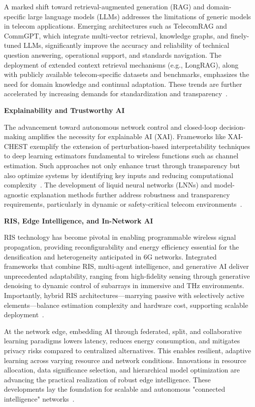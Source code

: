 \documentclass[sigconf]{acmart}
\begin{document}
A marked shift toward retrieval-augmented generation (RAG) and domain-specific large language models (LLMs) addresses the limitations of generic models in telecom applications. Emerging architectures such as TelecomRAG and CommGPT, which integrate multi-vector retrieval, knowledge graphs, and finely-tuned LLMs, significantly improve the accuracy and reliability of technical question answering, operational support, and standards navigation. The deployment of extended context retrieval mechanisms (e.g., LongRAG), along with publicly available telecom-specific datasets and benchmarks, emphasizes the need for domain knowledge and continual adaptation. These trends are further accelerated by increasing demands for standardization and transparency~\cite{ref13, ref14, ref15, ref16, ref17, ref18, ref19, ref20}.

\textbf{Explainability and Trustworthy AI}

The advancement toward autonomous network control and closed-loop decision-making amplifies the necessity for explainable AI (XAI). Frameworks like XAI-CHEST exemplify the extension of perturbation-based interpretability techniques to deep learning estimators fundamental to wireless functions such as channel estimation. Such approaches not only enhance trust through transparency but also optimize systems by identifying key inputs and reducing computational complexity~\cite{ref43, ref44, ref45, ref46, ref47, ref48, ref49}. The development of liquid neural networks (LNNs) and model-agnostic explanation methods further address robustness and transparency requirements, particularly in dynamic or safety-critical telecom environments~\cite{ref43}.

\textbf{RIS, Edge Intelligence, and In-Network AI}

RIS technology has become pivotal in enabling programmable wireless signal propagation, providing reconfigurability and energy efficiency essential for the densification and heterogeneity anticipated in 6G networks. Integrated frameworks that combine RIS, multi-agent intelligence, and generative AI deliver unprecedented adaptability, ranging from high-fidelity sensing through generative denoising to dynamic control of subarrays in immersive and THz environments. Importantly, hybrid RIS architectures—marrying passive with selectively active elements—balance estimation complexity and hardware cost, supporting scalable deployment~\cite{ref28, ref29, ref30, ref31, ref32, ref33, ref34}.

At the network edge, embedding AI through federated, split, and collaborative learning paradigms lowers latency, reduces energy consumption, and mitigates privacy risks compared to centralized alternatives. This enables resilient, adaptive learning across varying resource and network conditions. Innovations in resource allocation, data significance selection, and hierarchical model optimization are advancing the practical realization of robust edge intelligence. These developments lay the foundation for scalable and autonomous "connected intelligence" networks~\cite{ref35, ref36, ref37, ref38, ref39, ref40, ref41, ref42}.
\end{document}
